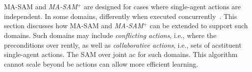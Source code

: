 \documentclass[letterpaper]{article} %
\theoremstyle{definition}
\theoremstyle{remark}
\newcommand{\iseff}{\text{IsEff}}
\newcommand{\sam}{\ac{SAM}\xspace}
\newcommand{\masam}{\ac{MA-SAM}\xspace}
\newcommand{\cmasam}{\textit{MA-SAM\ensuremath{^+}}\xspace}
\begin{document}












\section{}

\masam and \cmasam are designed for cases where single-agent actions are independent.
In some domains,  differently when executed concurrently~. This section discusses how \masam and \cmasam can be extended to support such domains. Such domains may include \emph{conflicting actions}, i.e., where the preconditions  over rently, as well as \emph{collaborative actions}, i.e., sets of acstituent single-agent actions.
The \sam over joint ac for such domains.
This algorithm cannot scale beyond 
 be actions can allow more efficient learning.
\end{document}

